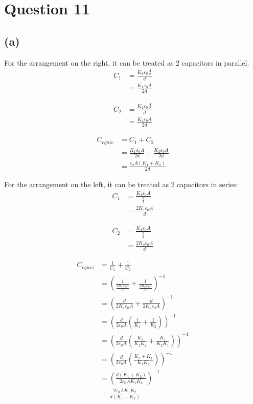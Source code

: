 \documentclass[11pt]{article}
\begin{document}
\newpage
\section{Question 11}
\label{sec:org49fb1a7}

\subsection{(a)}
\label{sec:org25f3517}
For the arrangement on the right, it can be treated as 2 capacitors in parallel.
\begin{align*}
C_1 &= \frac{K_1 \varepsilon_0 \frac{A}{2}}{d} \\
&= \frac{K_1 \varepsilon_0 A}{2d}
\end{align*}

\begin{align*}
C_2 &= \frac{K_2 \varepsilon_0 \frac{A}{2}}{d} \\
&= \frac{K_2 \varepsilon_0 A}{2d}
\end{align*}

\begin{align*}
C_{equiv} &= C_1 + C_2 \\
&= \frac{K_1 \varepsilon_0 A}{2d} + \frac{K_2 \varepsilon_0 A}{2d} \\
&= \frac{\varepsilon_0 A (K_1 + K_2)}{2d}
\end{align*}

\newpage

For the arrangement on the left, it can be treated as 2 capacitors in series:
\begin{align*}
C_1 &= \frac{K_1 \varepsilon_0 A}{\frac{d}{2}} \\
&= \frac{2K_1 \varepsilon_0 A}{d}
\end{align*}

\begin{align*}
C_2 &= \frac{K_2 \varepsilon_0 A}{\frac{d}{2}} \\
&= \frac{2K_2 \varepsilon_0 A}{d}
\end{align*}

\begin{align*}
C_{equiv} &= \frac{1}{C_1} + \frac{1}{C_2} \\
&= \left( \frac{1}{\frac{2K_1 \varepsilon_0 A}{d}} + \frac{1}{\frac{2K_2 \varepsilon_0 A}{d}} \right)^{-1} \\
&= \left( \frac{d}{2K_1 \varepsilon_0 A} + \frac{d}{2K_2 \varepsilon_0 A} \right)^{-1} \\
&= \left( \frac{d}{2 \varepsilon_0 A} \left( \frac{1}{K_1} + \frac{1}{K_2} \right) \right)^{-1} \\
&= \left( \frac{d}{2 \varepsilon_0 A} \left( \frac{K_2}{K_1 K_2} + \frac{K_1}{K_2 K_1} \right) \right)^{-1} \\
&= \left( \frac{d}{2 \varepsilon_0 A} \left( \frac{K_2 + K_1}{K_1K_2} \right) \right)^{-1} \\
&= \left( \frac{d(K_1 + K_2)}{2 \varepsilon_0 A K_1 K_2} \right)^{-1} \\
&= \frac{2 \varepsilon_0 A K_1 K_2}{d (K_1 + K_2)} \\
\end{align*}
\end{document}
